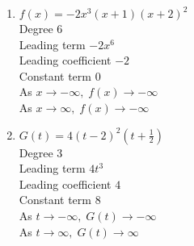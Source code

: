 \documentclass{ximera}
\begin{document}
\pagebreak

\begin{multicols}{2}
\begin{enumerate}
\setcounter{enumi}{\value{HW}}

\item $f(x) = -2x^3(x+1)(x+2)^2$ \\
Degree 6 \\
Leading term $-2x^{6}$\\
Leading coefficient $-2$\\
Constant term $0$\\
As $x \rightarrow -\infty, \; f(x) \rightarrow -\infty$\\
As $x \rightarrow \infty, \; f(x) \rightarrow -\infty$\\

\item $G(t) = 4(t-2)^2\left(t+\frac{1}{2}\right)$ \\
Degree 3 \\
Leading term $4t^3$\\
Leading coefficient $4$\\
Constant term $8$\\
As $t \rightarrow -\infty, \; G(t) \rightarrow -\infty$\\
As $t \rightarrow \infty, \; G(t) \rightarrow \infty$\\

\setcounter{HW}{\value{enumi}}
\end{enumerate}
\end{multicols}
\end{document}
